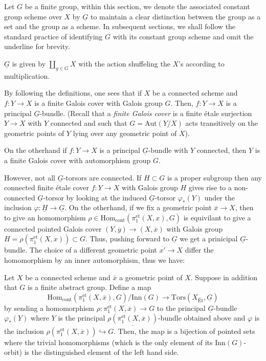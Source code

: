 Let $G$ be a finite group, within this section, we denote the associated constant group scheme over $X$ by $\underline{G}$ to maintain a clear distinction between the group as a set and the group as a scheme. In subsequent sections, we shall follow the standard practice of identifying $G$ with its constant group scheme and omit the underline for brevity.

$\underline{G}$ is given by $\coprod_{g \in G} X$ with the action shuffeling the $X$'s according to multiplication.

By following the definitions, one sees that if $X$ be a connected scheme and $f : Y \to X$ is a finite Galois cover with Galois group $G$. 
Then, $f : Y \to X$ is a principal $\underline{G}$-bundle.
(Recall that a \textit{finite Galois cover} is a finite étale surjection $Y \to X$ with $Y$ connected and such that 
$G = \text{Aut}(Y/X)$ acts transitively on the geometric points of $Y$ lying over any geometric point of $X$).

On the otherhand if $f: Y \to X$ is a principal $\underline{G}$-bundle with $Y$ connected, then $Y$ is a finite Galois cover with
automorphism group $G$.

However, not all $\underline{G}$-torsors are connected. If $H\subset G$ is a proper subgroup then any connected finite \'etale cover $f: Y \to X$ with 
Galois group $H$ gives rise to a non-connected $\underline{G}$-torsor by looking at the induced $\underline{G}$-torsor $\varphi_*(Y)$ under the inclusion $\varphi: \underline{H} \to \underline{G}$.
On the otherhand, if we fix a geometric point $\overline{x} \to X$, then to give an homomorphism
$\rho \in \mathrm{Hom}_{\mathrm{cont}}(\pi_1^{\mathrm{et}}(X, x), G)$ is equivilant to give a connected pointed Galois cover
$(Y, \overline{y}) \to (X, \overline{x})$ with Galois group $H=\rho(\pi_1^{\mathrm{et}}(X, x)) \subset G$. 
Thus, pushing forward to $\underline{G}$ we get a prinicipal $\underline{G}$-bundle. The choice of a different geometric point $\overline{x'} \to X$
differ the homomorphism by an inner automorphism, thus we have:

\begin{theorem}\label{theorem:equivalence_fundamental_covers}
    Let $X$ be a connected scheme and $\overline{x}$ a geometric point of $X$. Suppose in addition that $G$ is a finite abstract group. 
    Define a map
    \begin{equation}
        \mathrm{Hom}_{\mathrm{cont}}(\pi_1^{\mathrm{et}}(X, \overline{x}), G) / \mathrm{Inn}(G) \to \mathrm{Tors}(X_{\text{\'Et}}, \underline{G}) 
    \end{equation}
by sending a homomorphism $\rho : \pi_1^{\mathrm{et}}(X, \overline{x}) \to G$ 
to the principal $\underline{G}$-bundle $\varphi_*(Y)$ where $Y$ is the principal $\underline{\rho(\pi_1^{\mathrm{et}}(X, \overline{x}))}$-bundle 
obtained above and $\varphi$ is the inclusion $\rho(\pi_1^{\mathrm{et}}(X, \overline{x})) \hookrightarrow G$. Then, the map 
 is a bijection of pointed sets where the trivial homomorphisms
  (which is the only element of its $\mathrm{Inn}(G)$-orbit) is the distinguished element of the left hand side.
\end{theorem}

